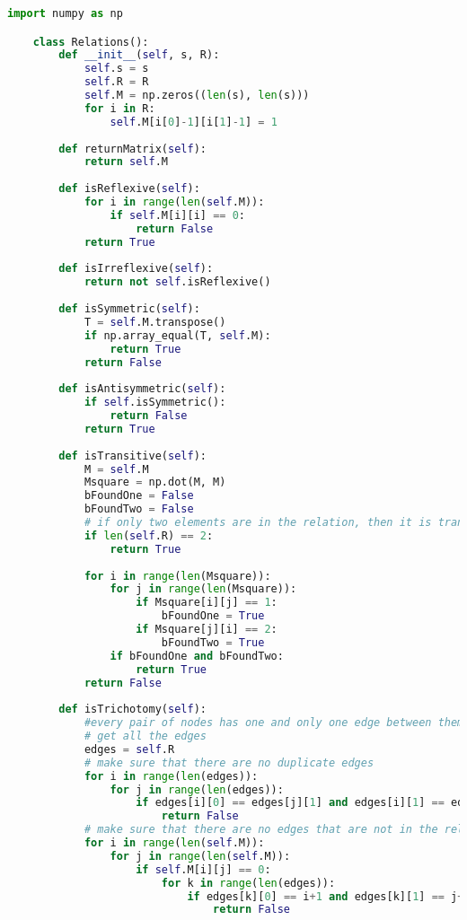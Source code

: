 \begin{lstlisting}[language=Python]
    import numpy as np

    class Relations():
        def __init__(self, s, R):
            self.s = s
            self.R = R
            self.M = np.zeros((len(s), len(s)))
            for i in R:
                self.M[i[0]-1][i[1]-1] = 1
    
        def returnMatrix(self):
            return self.M
    
        def isReflexive(self):
            for i in range(len(self.M)):
                if self.M[i][i] == 0:
                    return False
            return True
    
        def isIrreflexive(self):
            return not self.isReflexive()
    
        def isSymmetric(self):
            T = self.M.transpose()
            if np.array_equal(T, self.M):
                return True
            return False
    
        def isAntisymmetric(self):
            if self.isSymmetric():
                return False
            return True
    
        def isTransitive(self):
            M = self.M
            Msquare = np.dot(M, M)
            bFoundOne = False
            bFoundTwo = False
            # if only two elements are in the relation, then it is transitive (We cannot prove that R is not transitive. Such a proof actually has a special name: it is vacuously true that R is transitive.)
            if len(self.R) == 2:
                return True
    
            for i in range(len(Msquare)):
                for j in range(len(Msquare)):
                    if Msquare[i][j] == 1:
                        bFoundOne = True
                    if Msquare[j][i] == 2:
                        bFoundTwo = True
                if bFoundOne and bFoundTwo:
                    return True
            return False
    
        def isTrichotomy(self):
            #every pair of nodes has one and only one edge between them.        
            # get all the edges 
            edges = self.R
            # make sure that there are no duplicate edges
            for i in range(len(edges)):
                for j in range(len(edges)):
                    if edges[i][0] == edges[j][1] and edges[i][1] == edges[j][0]:
                        return False
            # make sure that there are no edges that are not in the relation                    
            for i in range(len(self.M)):
                for j in range(len(self.M)):
                    if self.M[i][j] == 0:
                        for k in range(len(edges)):
                            if edges[k][0] == i+1 and edges[k][1] == j+1:
                                return False
                    

\end{lstlisting}

